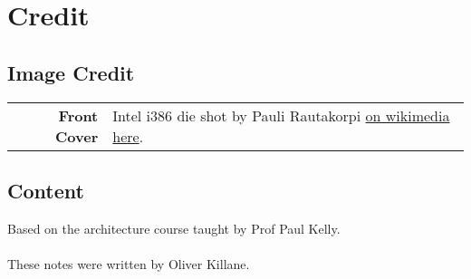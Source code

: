 \chapter{Credit}
\section*{Image Credit}
\begin{center}
    \begin{tabular}{r p{}}
        \textbf{Front Cover} & Intel i386 die shot by Pauli Rautakorpi \href{https://commons.wikimedia.org/wiki/File:Intel_80386_DX_die.JPG}{on wikimedia here}. \\
    \end{tabular}
\end{center}

\section*{Content}
Based on the architecture course taught by Prof Paul Kelly.
\\
\\ These notes were written by Oliver Killane.